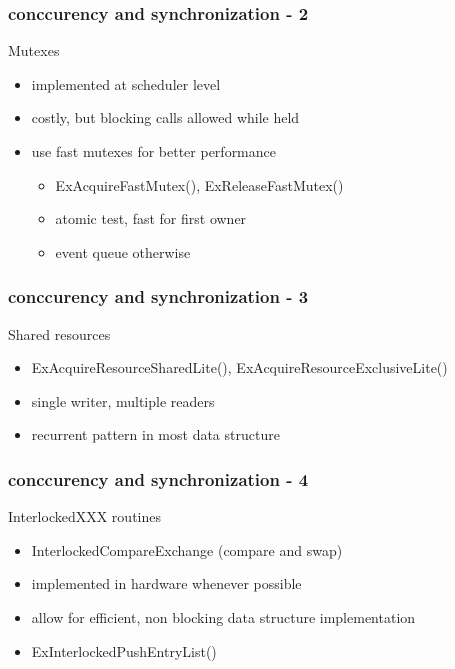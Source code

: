 
\begin{frame}
 \frametitle{conccurency and synchronization - 2}

 Mutexes

 \begin{itemize}
  \item implemented at scheduler level
  \item costly, but blocking calls allowed while held
  \item use fast mutexes for better performance
  \begin{itemize}
   \item ExAcquireFastMutex(), ExReleaseFastMutex()
   \item atomic test, fast for first owner
   \item event queue otherwise
  \end{itemize}
 \end{itemize}

\end{frame}


\begin{frame}
 \frametitle{conccurency and synchronization - 3}

 Shared resources

 \begin{itemize}
  \item ExAcquireResourceSharedLite(), ExAcquireResourceExclusiveLite()
  \item single writer, multiple readers
  \item recurrent pattern in most data structure
 \end{itemize}

\end{frame}


\begin{frame}
 \frametitle{conccurency and synchronization - 4}

 InterlockedXXX routines

 \begin{itemize}
  \item InterlockedCompareExchange (compare and swap)
  \item implemented in hardware whenever possible
  \item allow for efficient, non blocking data structure implementation
  \item ExInterlockedPushEntryList()
 \end{itemize}

\end{frame}


